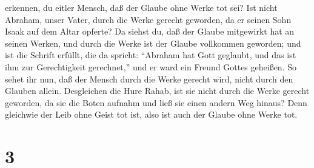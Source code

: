 erkennen, du eitler Mensch, daß der Glaube ohne Werke tot sei?
 Ist nicht Abraham, unser Vater, durch die Werke gerecht
geworden, da er seinen Sohn Isaak auf dem Altar opferte? 
Da siehst du, daß der Glaube mitgewirkt hat an seinen Werken, und durch
die Werke ist der Glaube vollkommen geworden;  und ist die
Schrift erfüllt, die da spricht: ``Abraham hat Gott geglaubt, und das
ist ihm zur Gerechtigkeit gerechnet,'' und er ward ein Freund Gottes
geheißen.  So sehet ihr nun, daß der Mensch durch die Werke
gerecht wird, nicht durch den Glauben allein.  Desgleichen
die Hure Rahab, ist sie nicht durch die Werke gerecht geworden, da sie
die Boten aufnahm und ließ sie einen andern Weg hinaus? 
Denn gleichwie der Leib ohne Geist tot ist, also ist auch der Glaube
ohne Werke tot.

\hypertarget{section-2}{%
\section{3}\label{section-2}}

